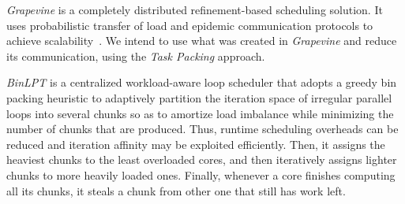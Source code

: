 \textit{Grapevine} is a completely distributed refinement-based scheduling solution.
It uses probabilistic transfer of load and epidemic communication protocols to achieve scalability~\cite{grapevine}.
We intend to use what was created in \textit{Grapevine} and reduce its communication, using the \textit{Task Packing} approach.

\textit{BinLPT} is a centralized workload-aware loop scheduler that adopts a greedy bin packing heuristic to adaptively partition the iteration space of irregular parallel loops into several chunks so as to amortize load imbalance while minimizing the number of chunks that are produced. Thus, runtime scheduling overheads can be reduced and iteration affinity may be exploited efficiently. Then, it assigns the heaviest chunks to the least overloaded cores, and then iteratively assigns lighter chunks to more heavily loaded ones. Finally, whenever a core finishes computing all its chunks, it steals a chunk from other one that still has work left.


